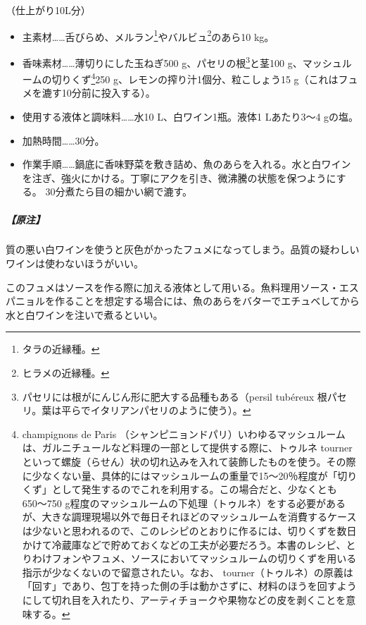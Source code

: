 \begin{recette}
（仕上がり10L分）

\begin{itemize}
\item
  主素材\ldots{}\ldots{}舌びらめ、メルラン\footnote{タラの近縁種。}やバルビュ\footnote{ヒラメの近縁種。}のあら10
  kg。
\item
  香味素材\ldots{}\ldots{}薄切りにした玉ねぎ500 g、パセリの根\footnote{パセリには根がにんじん形に肥大する品種もある（persil
    tubéreux 根パセリ。葉は平らでイタリアンパセリのように使う）。}と茎100
  g、マッシュルームの切りくず\footnote{champignons de Paris
    （シャンピニョンドパリ）いわゆるマッシュルームは、ガルニチュールなど料理の一部として提供する際に、トゥルネ
    tourner
    といって螺旋（らせん）状の切れ込みを入れて装飾したものを使う。その際に少なくない量、具体的にはマッシュルームの重量で15〜20％程度が「切りくず」として発生するのでこれを利用する。この場合だと、少なくとも650〜750
    g程度のマッシュルームの下処理（トゥルネ）をする必要があるが、大きな調理現場以外で毎日それほどのマッシュルームを消費するケースは少ないと思われるので、このレシピのとおりに作るには、切りくずを数日かけて冷蔵庫などで貯めておくなどの工夫が必要だろう。本書のレシピ、とりわけフォンやフュメ、ソースにおいてマッシュルームの切りくずを用いる指示が少なくないので留意されたい。なお、
    tourner（トゥルネ）の原義は「回す」であり、包丁を持った側の手は動かさずに、材料のほうを回すようにして切れ目を入れたり、アーティチョークや果物などの皮を剥くことを意味する。}250
  g、レモンの搾り汁1個分、粒こしょう15
  g（これはフュメを漉す10分前に投入する）。
\item
  使用する液体と調味料\ldots{}\ldots{}水10 L、白ワイン1瓶。液体1
  Lあたり3〜4 gの塩。
\item
  加熱時間\ldots{}\ldots{}30分。
\item
  作業手順\ldots{}\ldots{}鍋底に香味野菜を敷き詰め、魚のあらを入れる。水と白ワインを注ぎ、強火にかける。丁寧にアクを引き、微沸騰の状態を保つようにする。
  30分煮たら目の細かい網で漉す。
\end{itemize}

\hypertarget{nota-fumet-de-poisson}{%
\subparagraph{【原注】}\label{nota-fumet-de-poisson}}

質の悪い白ワインを使うと灰色がかったフュメになってしまう。品質の疑わしいワインは使わないほうがいい。

このフュメはソースを作る際に加える液体として用いる。魚料理用ソース・エスパニョルを作ることを想定する場合には、魚のあらをバターでエチュベしてから水と白ワインを注いで煮るといい。

\hypertarget{fonds-de-poisson-au-vin-rouge}{%
}
\end{recette}
